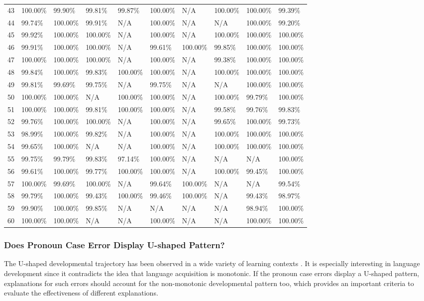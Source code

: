\begin{table}[h]
\begin{tabular}{c|lllllllll}
43 & 100.00\% & 99.90\% & 99.81\% & 99.87\% & 100.00\% & N/A & 100.00\% & 100.00\% & 99.39\% \\
44 & 99.74\% & 100.00\% & 99.91\% & N/A & 100.00\% & N/A & N/A & 100.00\% & 99.20\% \\
45 & 99.92\% & 100.00\% & 100.00\% & N/A & 100.00\% & N/A & 100.00\% & 100.00\% & 100.00\% \\
46 & 99.91\% & 100.00\% & 100.00\% & N/A & 99.61\% & 100.00\% & 99.85\% & 100.00\% & 100.00\% \\
47 & 100.00\% & 100.00\% & 100.00\% & N/A & 100.00\% & N/A & 99.38\% & 100.00\% & 100.00\% \\
48 & 99.84\% & 100.00\% & 99.83\% & 100.00\% & 100.00\% & N/A & 100.00\% & 100.00\% & 100.00\% \\
49 & 99.81\% & 99.69\% & 99.75\% & N/A & 99.75\% & N/A & N/A & 100.00\% & 100.00\% \\
50 & 100.00\% & 100.00\% & N/A & 100.00\% & 100.00\% & N/A & 100.00\% & 99.79\% & 100.00\% \\
51 & 100.00\% & 100.00\% & 99.81\% & 100.00\% & 100.00\% & N/A & 99.58\% & 99.76\% & 99.83\% \\
52 & 99.76\% & 100.00\% & 100.00\% & N/A & 100.00\% & N/A & 99.65\% & 100.00\% & 99.73\% \\
53 & 98.99\% & 100.00\% & 99.82\% & N/A & 100.00\% & N/A & 100.00\% & 100.00\% & 100.00\% \\
54 & 99.65\% & 100.00\% & N/A & N/A & 100.00\% & N/A & 100.00\% & 100.00\% & 100.00\% \\
55 & 99.75\% & 99.79\% & 99.83\% & 97.14\% & 100.00\% & N/A & N/A & N/A & 100.00\% \\
56 & 99.61\% & 100.00\% & 99.77\% & 100.00\% & 100.00\% & N/A & 100.00\% & 99.45\% & 100.00\% \\
57 & 100.00\% & 99.69\% & 100.00\% & N/A & 99.64\% & 100.00\% & N/A & N/A & 99.54\% \\
58 & 99.79\% & 100.00\% & 99.43\% & 100.00\% & 99.46\% & 100.00\% & N/A & 99.43\% & 98.97\% \\
59 & 99.90\% & 100.00\% & 99.85\% & N/A & N/A & N/A & N/A & 98.94\% & 100.00\% \\
60 & 100.00\% & 100.00\% & N/A & N/A & 100.00\% & N/A & N/A & 100.00\% & 100.00\% \\ 
\bottomrule
\end{tabular}
\end{table}
\FloatBarrier

\subsubsection{Does Pronoun Case Error Display U-shaped Pattern?}
The U-shaped developmental trajectory has been observed in a wide variety of learning contexts \citep[for a review, see][]{siegler2004u}. It is especially interesting in language development since it contradicts the idea that language acquisition is monotonic. If the pronoun case errors display a U-shaped pattern, explanations for such errors should account for the non-monotonic developmental pattern too, which provides an important criteria to evaluate the effectiveness of different explanations. 

